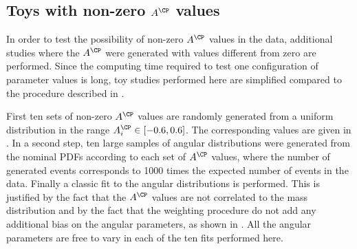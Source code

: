 \subsection{Toys with non-zero $A^{\CP}$ values}\label{sec:NZACPs}
In order to test the possibility of non-zero $A^{\CP}$ values in the data, additional studies where the $A^{\CP}$ were generated with values different from zero are performed. Since the computing time required to test one configuration of parameter values is long, toy studies performed here are simplified compared to the procedure described in . 
%

First ten sets of non-zero $A^{\CP}$ values are randomly generated from a uniform distribution in the range $A^{\CP}_i \in [-0.6,0.6]$. The corresponding values are given in . In a second step, ten large samples of \Bs angular distributions were generated from the \Bs nominal PDFs according to each set of $A^{\CP}$ values, where the number of generated events corresponds to 1000 times the expected number of \Bs events in the data. Finally a classic fit to the \Bs angular distributions is performed. This is justified by the fact that the $A^{\CP}$ values are not correlated to the mass distribution and by the fact that the weighting procedure do not add any additional bias on the angular parameters, as shown in . All the \Bs angular parameters are free to vary in each of the ten fits performed here.
%
